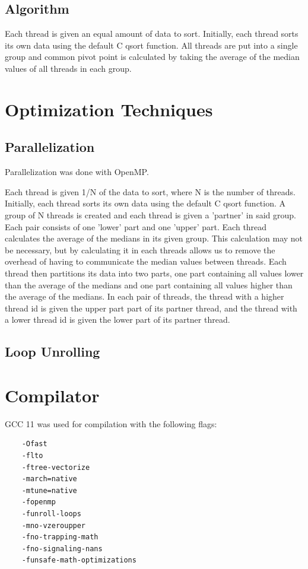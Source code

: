 \documentclass{report}
\begin{document}
\subsection{Algorithm}
Each thread is given an equal amount of data to sort. Initially, each thread sorts its own data using the default C qsort function. 
All threads are put into a single group and common pivot point is calculated by taking the average of the median values of all threads in each group.
\section{Optimization Techniques}
\subsection{Parallelization}
Parallelization was done with OpenMP. 

Each thread is given 1/N of the data to sort, where N is the number of threads.
Initially, each thread sorts its own data using the default C qsort function. A group of N threads is created and each thread is given a 'partner' in said group. Each pair consists of one 'lower' part and one 'upper' part. 
Each thread calculates the average of the medians in its given group. This calculation may not be necessary, but by calculating it in each threads allows us to remove the overhead of having to communicate the median values between threads. 
Each thread then partitions its data into two parts, one part containing all values lower than the average of the medians and one part containing all values higher than the average of the medians. In each pair of threads,
the thread with a higher thread id is given the upper part part of its partner thread, and the thread with a lower thread id is given the lower part of its partner thread.




\subsection{Loop Unrolling}


\section{Compilator}
GCC 11 was used for compilation with the following flags:
\begin{lstlisting}
    -Ofast 
    -flto 
    -ftree-vectorize 
    -march=native 
    -mtune=native
    -fopenmp 
    -funroll-loops  
    -mno-vzeroupper 
    -fno-trapping-math 
    -fno-signaling-nans 
    -funsafe-math-optimizations
\end{lstlisting}
\end{document}
